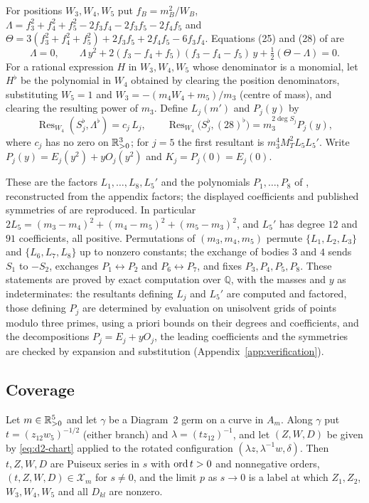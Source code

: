 \begin{definition}\label{def:d2-mass}
For positions $W_3,W_4,W_5$ put $f_B=m_B^2/W_B$,
$\Lambda=f_3^2+f_4^2+f_5^2-2f_3f_4-2f_3f_5-2f_4f_5$ and
$\Theta=3(f_3^2+f_4^2+f_5^2)+2f_3f_5+2f_4f_5-6f_3f_4$.  Equations (25) and (28) of
\cite[\S8.2]{AK} are
\begin{equation}\label{eq:d2-25-28}
  \Lambda=0,\qquad
  \Lambda\,y^2+2(f_3-f_4+f_5)(f_3-f_4-f_5)\,y+\tfrac12(\Theta-\Lambda)=0 .
\end{equation}
For a rational expression $H$ in $W_3,W_4,W_5$ whose denominator is a monomial, let $H^\flat$ be
the polynomial in $W_4$ obtained by clearing the position denominators, substituting $W_5=1$ and
$W_3=-(m_4W_4+m_5)/m_3$ (centre of mass), and clearing the resulting power of $m_3$.  Define
$L_j(m')$ and $P_j(y)$ by
\[
  \operatorname{Res}_{W_4}(S_j^\flat,\Lambda^\flat)=c_j\,L_j,\qquad
  \operatorname{Res}_{W_4}\bigl(S_j^\flat,(28)^\flat\bigr)=m_3^{2\deg S_j}P_j(y),
\]
where $c_j$ has no zero on $\mathbb{R}_{>0}^3$; for $j=5$ the first resultant is
$m_3^4M_T^2L_5L_5'$.  Write $P_j(y)=E_j(y^2)+yO_j(y^2)$ and $K_j=P_j(0)=E_j(0)$.
\end{definition}

These are the factors $L_1,\dots,L_8,L_5'$ and the polynomials $P_1,\dots,P_8$ of
\cite[pp.~573--575]{AK}, reconstructed from the appendix factors; the displayed coefficients and
published symmetries of \cite{AK} are reproduced.  In particular
$2L_5=(m_3-m_4)^2+(m_4-m_5)^2+(m_5-m_3)^2$, and $L_5'$ has degree $12$ and $91$ coefficients, all
positive.
Permutations of $(m_3,m_4,m_5)$ permute $\{L_1,L_2,L_3\}$ and $\{L_6,L_7,L_8\}$ up to nonzero
constants; the exchange of bodies $3$ and $4$ sends $S_1$ to $-S_2$, exchanges $P_1\leftrightarrow
P_2$ and $P_6\leftrightarrow P_7$, and fixes $P_3,P_4,P_5,P_8$.
These statements are proved by exact computation over $\mathbb Q$, with the masses and $y$ as
indeterminates: the resultants defining $L_j$ and $L_5'$ are computed and factored, those
defining $P_j$ are determined by evaluation on unisolvent grids of points modulo three primes,
using a priori bounds on their degrees and coefficients, and the decompositions $P_j=E_j+yO_j$,
the leading coefficients and the symmetries are checked by expansion and substitution
(Appendix~\ref{app:verification}).
\subsection{Coverage}\label{sec:d2-cover}

\begin{proposition}[Coverage]\label{prop:d2-cover}
Let $m\in\mathbb{R}_{>0}^5$ and let $\gamma$ be a Diagram~2 germ on a curve in $A_m$.  Along $\gamma$ put
$t=(z_{12}w_5)^{-1/2}$ \textup{(}either branch\textup{)} and $\lambda=(tz_{12})^{-1}$, and let
$(Z,W,D)$ be given by \eqref{eq:d2-chart} applied to the rotated configuration
$(\lambda z,\lambda^{-1}w,\delta)$.  Then $t,Z,W,D$ are Puiseux series in $s$ with $\operatorname{ord} t>0$ and
nonnegative orders, $(t,Z,W,D)\in\mathcal X_m$ for $s\ne0$, and the limit $p$ as $s\to0$ is a label at
which $Z_1,Z_2$, $W_3,W_4,W_5$ and all $D_{kl}$ are nonzero.
\end{proposition}

